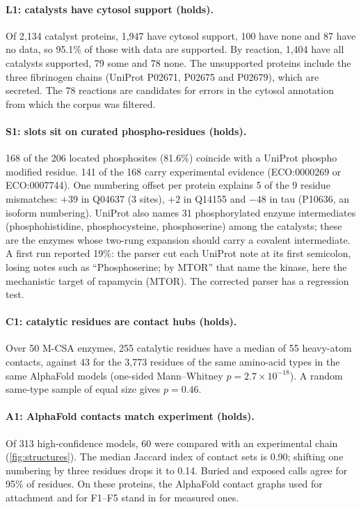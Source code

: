 \paragraph{L1: catalysts have cytosol support (holds).}
Of 2{,}134 catalyst proteins, 1{,}947 have cytosol support, 100 have none and 87 have no data, so 95.1\% of those with data are supported.
By reaction, 1{,}404 have all catalysts supported, 79 some and 78 none.
The unsupported proteins include the three fibrinogen chains (UniProt P02671, P02675 and P02679), which are secreted.
The 78 reactions are candidates for errors in the cytosol annotation from which the corpus was filtered.

\paragraph{S1: slots sit on curated phospho-residues (holds).}
168 of the 206 located phosphosites (81.6\%) coincide with a UniProt phospho modified residue.
141 of the 168 carry experimental evidence (ECO:0000269 or ECO:0007744).
One numbering offset per protein explains 5 of the 9 residue mismatches: $+39$ in Q04637 (3 sites), $+2$ in Q14155 and $-48$ in tau (P10636, an isoform numbering).
UniProt also names 31 phosphorylated enzyme intermediates (phosphohistidine, phosphocysteine, phosphoserine) among the catalysts; these are the enzymes whose two-rung expansion should carry a covalent intermediate.
A first run reported 19\%: the parser cut each UniProt note at its first semicolon, losing notes such as ``Phosphoserine; by MTOR'' that name the kinase, here the mechanistic target of rapamycin (MTOR).
The corrected parser has a regression test.

\paragraph{C1: catalytic residues are contact hubs (holds).}
Over 50 M-CSA enzymes, 255 catalytic residues have a median of 55 heavy-atom contacts, against 43 for the 3{,}773 residues of the same amino-acid types in the same AlphaFold models (one-sided Mann--Whitney $p=2.7\times10^{-18}$).
A random same-type sample of equal size gives $p=0.46$.

\paragraph{A1: AlphaFold contacts match experiment (holds).}
Of 313 high-confidence models, 60 were compared with an experimental chain (\cref{fig:structures}).
The median Jaccard index of contact sets is 0.90; shifting one numbering by three residues drops it to 0.14.
Buried and exposed calls agree for 95\% of residues.
On these proteins, the AlphaFold contact graphs used for attachment and for F1--F5 stand in for measured ones.

